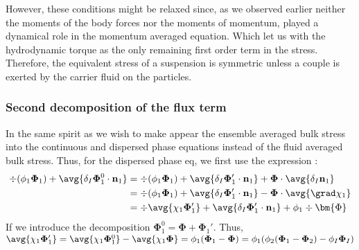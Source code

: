 However, these conditions might be relaxed since, as we observed earlier  neither the moments of the body forces nor the moments of momentum, played a dynamical role in the momentum averaged equation. 
Which let us with the hydrodynamic torque as the only remaining first order term in the stress.
Therefore, the equivalent stress of a suspension is symmetric unless a couple is exerted by the carrier fluid on the particles. 


\subsubsection{Second decomposition of the flux term}
In the same spirit as \citet{chu2016flux} we wish to make appear the ensemble averaged bulk stress into the continuous and dispersed phase equations instead of the fluid averaged bulk stress. 
Thus, for the dispersed phase eq, we first use the expression :
\begin{align*}
    \div  (\phi_1 \mathbf{\Phi}_1)
    + \avg{\delta_I \mathbf{\Phi}_1^0 \cdot \textbf{n}_1}
    &=
    \div  (\phi_1 \mathbf{\Phi}_1)
    + \avg{\delta_I \mathbf{\Phi}_1' \cdot \textbf{n}_1}
    + \mathbf{\Phi} \cdot  \avg{\delta_I \textbf{n}_1}\\
    &=
    \div  (\phi_1 \mathbf{\Phi}_1)
    + \avg{\delta_I \mathbf{\Phi}_1' \cdot \textbf{n}_1}
    - \mathbf{\Phi} \cdot  \avg{\grad\chi_1}\\
    &=
    \div  \avg{\chi_1 \mathbf{\Phi}_1'}
    + \avg{\delta_I \mathbf{\Phi}_1' \cdot \textbf{n}_1}
    + \phi_1 \div \bm{\Phi}\\
\end{align*}
If we introduce the decomposition  $\mathbf{\Phi}_1^0 =  \mathbf{\Phi} + \mathbf{\Phi}_1'$.
Thus, $\avg{\chi_1\mathbf{\Phi}_1'} 
= \avg{\chi_1 \mathbf{\Phi}_1^0} - \avg{\chi_1\mathbf{\Phi}}
= \phi_1 (\mathbf{\Phi}_1 - \mathbf{\Phi})
= \phi_1 ( \phi_2 (\mathbf{\Phi}_1  -  \mathbf{\Phi}_2)  - \phi_I \mathbf{\Phi}_I )$
